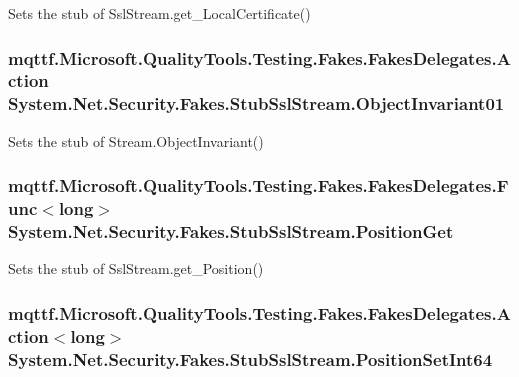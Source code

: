 Sets the stub of Ssl\-Stream.\-get\-\_\-\-Local\-Certificate()

\hypertarget{class_system_1_1_net_1_1_security_1_1_fakes_1_1_stub_ssl_stream_a99840e693b0ecff97f3a4958482aefea}{
\subsubsection[{Object\-Invariant01}]{\setlength{\rightskip}{0pt plus 5cm}mqttf.\-Microsoft.\-Quality\-Tools.\-Testing.\-Fakes.\-Fakes\-Delegates.\-Action System.\-Net.\-Security.\-Fakes.\-Stub\-Ssl\-Stream.\-Object\-Invariant01}}\label{class_system_1_1_net_1_1_security_1_1_fakes_1_1_stub_ssl_stream_a99840e693b0ecff97f3a4958482aefea}


Sets the stub of Stream.\-Object\-Invariant()

\hypertarget{class_system_1_1_net_1_1_security_1_1_fakes_1_1_stub_ssl_stream_af6efd17fa4b8810bea5a38b34f41c5a0}{
\subsubsection[{Position\-Get}]{\setlength{\rightskip}{0pt plus 5cm}mqttf.\-Microsoft.\-Quality\-Tools.\-Testing.\-Fakes.\-Fakes\-Delegates.\-Func$<$long$>$ System.\-Net.\-Security.\-Fakes.\-Stub\-Ssl\-Stream.\-Position\-Get}}\label{class_system_1_1_net_1_1_security_1_1_fakes_1_1_stub_ssl_stream_af6efd17fa4b8810bea5a38b34f41c5a0}


Sets the stub of Ssl\-Stream.\-get\-\_\-\-Position()

\hypertarget{class_system_1_1_net_1_1_security_1_1_fakes_1_1_stub_ssl_stream_a83a0d801677c029ecb6f7497ae4457b4}{
\subsubsection[{Position\-Set\-Int64}]{\setlength{\rightskip}{0pt plus 5cm}mqttf.\-Microsoft.\-Quality\-Tools.\-Testing.\-Fakes.\-Fakes\-Delegates.\-Action$<$long$>$ System.\-Net.\-Security.\-Fakes.\-Stub\-Ssl\-Stream.\-Position\-Set\-Int64}}\label{class_system_1_1_net_1_1_security_1_1_fakes_1_1_stub_ssl_stream_a83a0d801677c029ecb6f7497ae4457b4}


